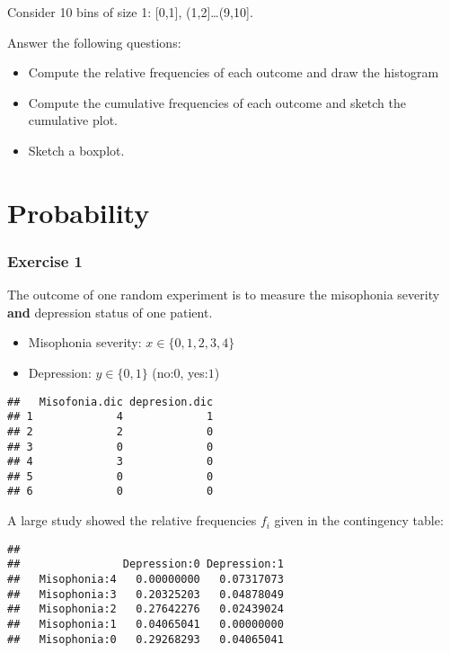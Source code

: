 \documentclass[
]{book}
\providecommand{\tightlist}{%
  \setlength{\itemsep}{0pt}\setlength{\parskip}{0pt}}
\begin{document}
Consider 10 bins of size 1: {[}0,1{]}, (1,2{]}\ldots(9,10{]}.

Answer the following questions:

\begin{itemize}
\item
  Compute the relative frequencies of each outcome and draw the histogram
\item
  Compute the cumulative frequencies of each outcome and sketch the cumulative plot.
\item
  Sketch a boxplot.
\end{itemize}

\hypertarget{probability-3}{%
\section{Probability}\label{probability-3}}

\hypertarget{exercise-1-1}{%
\subsubsection{Exercise 1}\label{exercise-1-1}}

The outcome of one random experiment is to measure the misophonia severity \textbf{and} depression status of one patient.

\begin{itemize}
\tightlist
\item
  Misophonia severity: \(x\in \{0,1,2,3,4\}\)
\item
  Depression: \(y\in \{0,1\}\) (no:\(0\), yes:\(1\))
\end{itemize}

\begin{verbatim}
##   Misofonia.dic depresion.dic
## 1             4             1
## 2             2             0
## 3             0             0
## 4             3             0
## 5             0             0
## 6             0             0
\end{verbatim}

A large study showed the relative frequencies \(f_i\) given in the contingency table:

\begin{verbatim}
##               
##                Depression:0 Depression:1
##   Misophonia:4   0.00000000   0.07317073
##   Misophonia:3   0.20325203   0.04878049
##   Misophonia:2   0.27642276   0.02439024
##   Misophonia:1   0.04065041   0.00000000
##   Misophonia:0   0.29268293   0.04065041
\end{verbatim}
\end{document}
